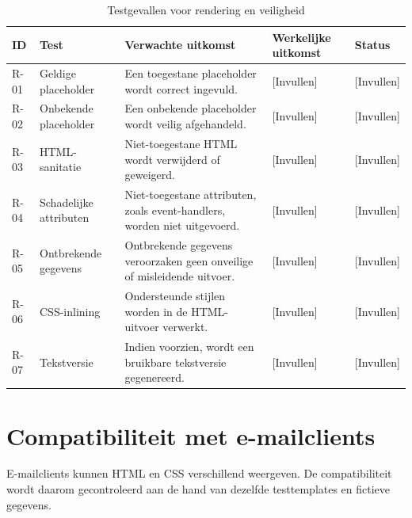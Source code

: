\begin{table}[htbp]
    \centering
    \caption{Testgevallen voor rendering en veiligheid}
    \label{tab:veiligheidstests}
    \small
    \begin{tabular}{|p{1.2cm}|p{3cm}|p{4.2cm}|p{3cm}|p{1.5cm}|}
        \hline
        \textbf{ID} & \textbf{Test} & \textbf{Verwachte uitkomst} &
        \textbf{Werkelijke uitkomst} & \textbf{Status} \\
        \hline
        R-01 & Geldige placeholder &
        Een toegestane placeholder wordt correct ingevuld. &
        [Invullen] & [Invullen] \\
        \hline
        R-02 & Onbekende placeholder &
        Een onbekende placeholder wordt veilig afgehandeld. &
        [Invullen] & [Invullen] \\
        \hline
        R-03 & HTML-sanitatie &
        Niet-toegestane HTML wordt verwijderd of geweigerd. &
        [Invullen] & [Invullen] \\
        \hline
        R-04 & Schadelijke attributen &
        Niet-toegestane attributen, zoals event-handlers, worden niet uitgevoerd. &
        [Invullen] & [Invullen] \\
        \hline
        R-05 & Ontbrekende gegevens &
        Ontbrekende gegevens veroorzaken geen onveilige of misleidende uitvoer. &
        [Invullen] & [Invullen] \\
        \hline
        R-06 & CSS-inlining &
        Ondersteunde stijlen worden in de HTML-uitvoer verwerkt. &
        [Invullen] & [Invullen] \\
        \hline
        R-07 & Tekstversie &
        Indien voorzien, wordt een bruikbare tekstversie gegenereerd. &
        [Invullen] & [Invullen] \\
        \hline
    \end{tabular}
\end{table}

\section{Compatibiliteit met e-mailclients}
E-mailclients kunnen HTML en CSS verschillend weergeven. De compatibiliteit
wordt daarom gecontroleerd aan de hand van dezelfde testtemplates en
fictieve gegevens.


